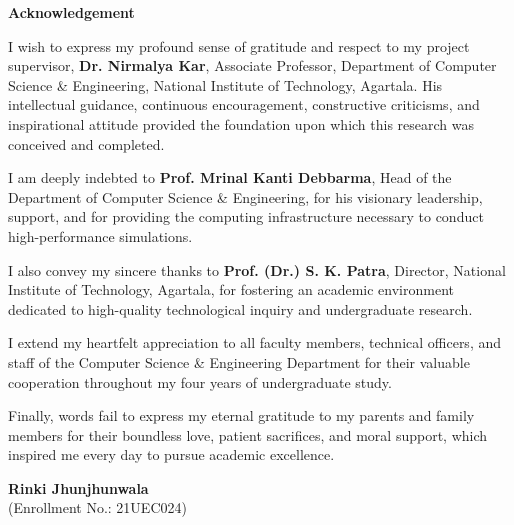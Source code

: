 \documentclass[12pt,a4paper,oneside]{report}
\newenvironment{acknowledgements}
{
  \cleardoublepage
  \thispagestyle{plain}
  \begin{center}
    {\Large\bfseries Acknowledgement}\par
    \vspace{0.3in}
  \end{center}
}
{
  \vfill
}
\begin{document}
\begin{acknowledgements}
    I wish to express my profound sense of gratitude and respect to my project supervisor, \textbf{Dr. Nirmalya Kar}, Associate Professor, Department of Computer Science \& Engineering, National Institute of Technology, Agartala. His intellectual guidance, continuous encouragement, constructive criticisms, and inspirational attitude provided the foundation upon which this research was conceived and completed.

    I am deeply indebted to \textbf{Prof. Mrinal Kanti Debbarma}, Head of the Department of Computer Science \& Engineering, for his visionary leadership, support, and for providing the computing infrastructure necessary to conduct high-performance simulations.

    I also convey my sincere thanks to \textbf{Prof. (Dr.) S. K. Patra}, Director, National Institute of Technology, Agartala, for fostering an academic environment dedicated to high-quality technological inquiry and undergraduate research.

    I extend my heartfelt appreciation to all faculty members, technical officers, and staff of the Computer Science \& Engineering Department for their valuable cooperation throughout my four years of undergraduate study.

    Finally, words fail to express my eternal gratitude to my parents and family members for their boundless love, patient sacrifices, and moral support, which inspired me every day to pursue academic excellence.
    
    \vspace{1.5in}
    \begin{flushright}
        \textbf{Rinki Jhunjhunwala}\\
        (Enrollment No.: 21UEC024)
    \end{flushright}
\end{acknowledgements}

\cleardoublepage
{}
{}
\listoffigures

\cleardoublepage
{}
{}
\listoftables
\end{document}
